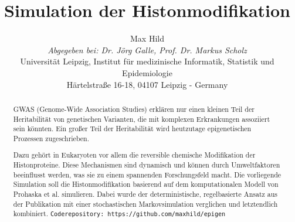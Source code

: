 \documentclass{SeminarV2}
\begin{document}
\title{Simulation der Histonmodifikation}

\author{Max Hild
\vspace{.3cm}\\
%
\emph{Abgegeben bei: Dr. J\"{o}rg Galle, Prof. Dr. Markus Scholz}
\vspace{.1cm}\\
Universit\"{a}t Leipzig, Institut f\"{u}r medizinische Informatik, Statistik und Epidemiologie\\
Härtelstraße 16-18, 04107 Leipzig - Germany
}



\maketitle

\begin{abstract}
  \sloppy
  GWAS (Genome-Wide Association Studies) erklären nur einen kleinen Teil der Heritabilität von 
  genetischen Varianten, die mit komplexen Erkrankungen assoziiert sein k\"{o}nnten.
  \cite{mcclellan-2010} Ein großer Teil der Heritabilität wird heutzutage epigenetischen Prozessen
  zugeschrieben.
    
  Dazu gehört in Eukaryoten vor allem die reversible chemische Modifikation der Histonproteine. \cite{prohaska-2010}
  Diese Mechanismen sind dynamisch und k\"{o}nnen durch Umweltfaktoren beeinflusst werden, 
  was sie zu einem spannenden Forschungsfeld macht. Die vorliegende Simulation soll die 
  Histonmodifikation basierend auf dem komputationalen Modell von Prohaska et al. simulieren.
  Dabei wurde der deterministische, regelbasierte Ansatz aus der Publikation mit einer 
  stochastischen Markovsimulation verglichen und letztendlich kombiniert.
  \texttt{Coderepository: https://github.com/maxhild/epigen}

  \end{abstract}
  
\end{document}
